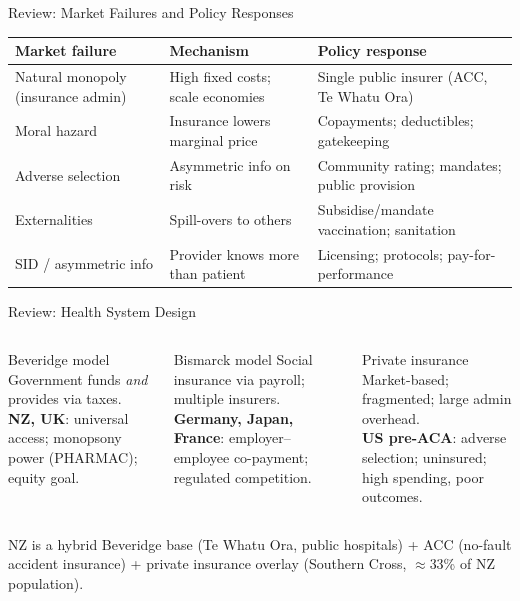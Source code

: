 \documentclass[aspectratio=169, 12pt]{beamer}
\begin{document}
\begin{frame}{Review: Market Failures and Policy Responses}
  \begin{center}
    \begin{tabular}{@{}p{3.5cm}p{4.5cm}p{4cm}@{}}
      \toprule
      \textbf{Market failure} & \textbf{Mechanism} & \textbf{Policy response} \\
      \midrule
      Natural monopoly (insurance admin) & High fixed costs; scale economies & Single public insurer (ACC, Te Whatu Ora) \\[0.3em]
      Moral hazard & Insurance lowers marginal price & Copayments; deductibles; gatekeeping \\[0.3em]
      Adverse selection & Asymmetric info on risk & Community rating; mandates; public provision \\[0.3em]
      Externalities & Spill-overs to others & Subsidise/mandate vaccination; sanitation \\[0.3em]
      SID / asymmetric info & Provider knows more than patient & Licensing; protocols; pay-for-performance \\
      \bottomrule
    \end{tabular}
  \end{center}
\end{frame}

\begin{frame}{Review: Health System Design}
  \begin{columns}
      \begin{block}{Beveridge model}
        Government funds \emph{and} provides via taxes.\\[0.3em]
        \textbf{NZ, UK}: universal access; monopsony power (PHARMAC); equity goal.
      \end{block}
      \begin{alertblock}{Bismarck model}
        Social insurance via payroll; multiple insurers.\\[0.3em]
        \textbf{Germany, Japan, France}: employer--employee co-payment; regulated competition.
      \end{alertblock}
      \begin{block}{Private insurance}
        Market-based; fragmented; large admin overhead.\\[0.3em]
        \textbf{US pre-ACA}: adverse selection; uninsured; high spending, poor outcomes.
      \end{block}
  \end{columns}
  \vspace{0.5em}
  \begin{exampleblock}{NZ is a hybrid}
    Beveridge base (Te Whatu Ora, public hospitals) + ACC (no-fault accident insurance)
    + private insurance overlay (Southern Cross, $\approx$33\% of NZ population).
  \end{exampleblock}
\end{frame}
\end{document}
